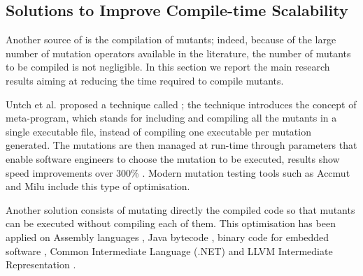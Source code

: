 
\subsection{Solutions to Improve Compile-time Scalability}
\label{sub:compileTime}
\label{sec:opt:selection}

Another source of  is the compilation of mutants;
indeed, because of the large number of mutation operators available in the literature, the number of mutants to be compiled is not negligible. In this section we report the main research results aiming at reducing the time required to compile mutants.

Untch et al. \cite{untch1993mutation} proposed a technique called ; the technique introduces the concept of meta-program, which stands for including and compiling all the mutants in a single executable file, instead of compiling one executable per mutation generated. The mutations are then managed at run-time through parameters that enable software engineers to choose the mutation to be executed, results show speed improvements over 300\% \cite{untch1993mutation,papadakis2010automatic}. Modern mutation testing tools such as Accmut \cite{wang2017faster} and Milu \cite{jia2008milu} include this type of optimisation.

Another solution consists of mutating directly the compiled code so that mutants can be executed without compiling each of them.
This optimisation has been applied on 
Assembly languages \cite{crouzet2006sesame},
Java bytecode \cite{ma2006mujava}, 
binary code for embedded software \cite{becker2012xemu},
Common Intermediate Language (.NET) \cite{derezinska2011object} 
and LLVM Intermediate Representation \cite{hariri2016evaluating}. 



